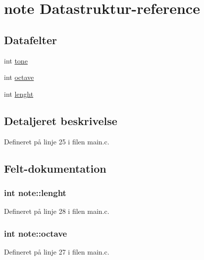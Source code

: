 \hypertarget{structnote}{\section{note Datastruktur-\/reference}
\label{structnote}
}
\subsection*{Datafelter}
\begin{DoxyCompactItemize}
\item 
int \hyperlink{structnote_a30832d96c968d682e5838b39370a1908}{tone}
\item 
int \hyperlink{structnote_a8b58f133e02c3ea4ec40ee641b654dcf}{octave}
\item 
int \hyperlink{structnote_a361dd34c08a22e0d8af45bfb8fefb287}{lenght}
\end{DoxyCompactItemize}


\subsection{Detaljeret beskrivelse}


Defineret på linje 25 i filen main.\+c.



\subsection{Felt-\/dokumentation}
\hypertarget{structnote_a361dd34c08a22e0d8af45bfb8fefb287}{
\subsubsection[{lenght}]{\setlength{\rightskip}{0pt plus 5cm}int note\+::lenght}}\label{structnote_a361dd34c08a22e0d8af45bfb8fefb287}


Defineret på linje 28 i filen main.\+c.

\hypertarget{structnote_a8b58f133e02c3ea4ec40ee641b654dcf}{
\subsubsection[{octave}]{\setlength{\rightskip}{0pt plus 5cm}int note\+::octave}}\label{structnote_a8b58f133e02c3ea4ec40ee641b654dcf}


Defineret på linje 27 i filen main.\+c.

